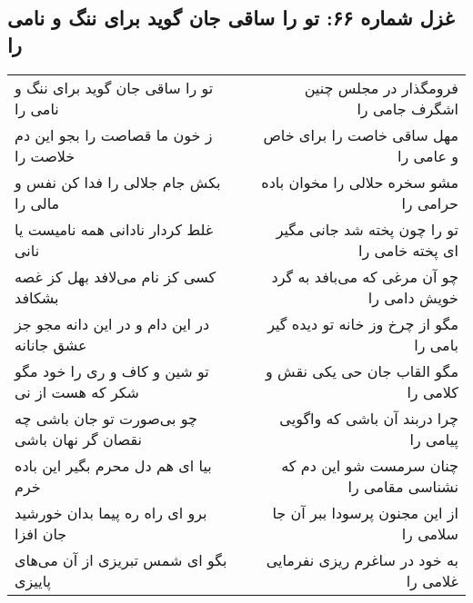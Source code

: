 \begin{center}
\section*{غزل شماره ۶۶: تو را ساقی جان گوید برای ننگ و نامی را}
\label{sec:0066}
\begin{longtable}{l p{0.5cm} r}
تو را ساقی جان گوید برای ننگ و نامی را
&&
فرومگذار در مجلس چنین اشگرف جامی را
\\
ز خون ما قصاصت را بجو این دم خلاصت را
&&
مهل ساقی خاصت را برای خاص و عامی را
\\
بکش جام جلالی را فدا کن نفس و مالی را
&&
مشو سخره حلالی را مخوان باده حرامی را
\\
غلط کردار نادانی همه نامیست یا نانی
&&
تو را چون پخته شد جانی مگیر ای پخته خامی را
\\
کسی کز نام می‌لافد بهل کز غصه بشکافد
&&
چو آن مرغی که می‌بافد به گرد خویش دامی را
\\
در این دام و در این دانه مجو جز عشق جانانه
&&
مگو از چرخ وز خانه تو دیده گیر بامی را
\\
تو شین و کاف و ری را خود مگو شکر که هست از نی
&&
مگو القاب جان حی یکی نقش و کلامی را
\\
چو بی‌صورت تو جان باشی چه نقصان گر نهان باشی
&&
چرا دربند آن باشی که واگویی پیامی را
\\
بیا ای هم دل محرم بگیر این باده خرم
&&
چنان سرمست شو این دم که نشناسی مقامی را
\\
برو ای راه ره پیما بدان خورشید جان افزا
&&
از این مجنون پرسودا ببر آن جا سلامی را
\\
بگو ای شمس تبریزی از آن می‌های پاییزی
&&
به خود در ساغرم ریزی نفرمایی غلامی را
\\
\end{longtable}
\end{center}

